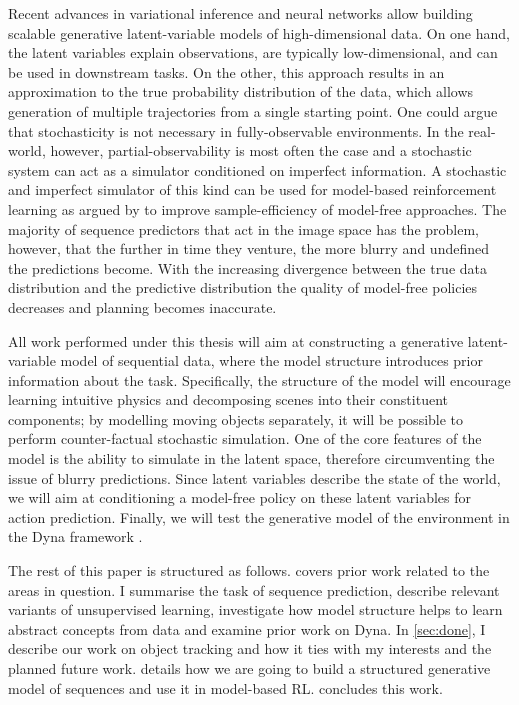     Recent advances in variational inference and neural networks allow building scalable generative latent-variable models of high-dimensional data.
    On one hand, the latent variables explain observations, are typically low-dimensional, and can be used in downstream tasks.
    On the other, this approach results in an approximation to the true probability distribution of the data, which allows generation of multiple trajectories from a single starting point. 
    One could argue that stochasticity is not necessary in fully-observable environments. In the real-world, however, partial-observability is most often the case and a stochastic system can act as a simulator conditioned on imperfect information. 
%    
    A stochastic and imperfect simulator of this kind can be used for model-based reinforcement learning as argued by \cite{Sutton1991} to improve sample-efficiency of model-free approaches. 
    The majority of sequence predictors that act in the image space has the problem, however, that the further in time they venture, the more blurry and undefined the predictions become. 
    With the increasing divergence between the true data distribution and the predictive distribution the quality of model-free policies decreases and planning becomes inaccurate.

    All work performed under this thesis will aim at constructing a generative latent-variable model of sequential data, where the model structure introduces prior information about the task. Specifically, the structure of the model will encourage learning intuitive physics and decomposing scenes into their constituent components; by modelling moving objects separately, it will be possible to perform counter-factual stochastic simulation. One of the core features of the model is the ability to simulate in the latent space, therefore circumventing the issue of blurry predictions. Since latent variables describe the state of the world, we will aim at conditioning a model-free policy on these latent variables for action prediction. Finally, we will test the generative model of the environment in the Dyna framework \citep{Sutton1991}.
    
    The rest of this paper is structured as follows.
     covers prior work related to the areas in question.
    I summarise the task of sequence prediction, describe relevant variants of unsupervised learning, investigate how model structure helps to learn abstract concepts from data and examine prior work on Dyna.
    In \cref{sec:done}, I describe our work on object tracking and how it ties with my interests and the planned future work.
     details how we are going to build a structured generative model of sequences and use it in model-based RL.
     concludes this work.